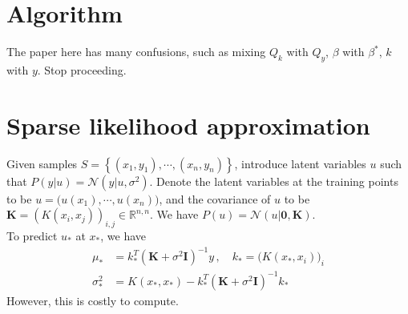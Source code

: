 \documentclass[a4paper,onecolumn]{article}
\begin{document}
\section{Algorithm}
\begin{algorithm}
\end{algorithm}
The paper here has many confusions, such as mixing $Q_k$ with $Q_y$, $\beta$ with $\beta^*$, $k$ with $y$. Stop proceeding.
\newpage
\section{Sparse likelihood approximation}
Given samples $S=\left\{ (x_1, y_1), \cdots, (x_n, y_n) \right\}$, introduce latent variables $u$ such that
$P(y|u) = \mathcal{N}(y|u, \sigma^2)$. Denote the latent variables at the training points to be
$u = \Big(u(x_1), \cdots, u(x_n)\Big)$, and the covariance of $u$ to be $\mathbf{K} = (K(x_i, x_j))_{i,j}\in \mathbb{R}^{n,n}$.
We have $P({u}) = \mathcal{N}({u}|\mathbf{0}, \mathbf{K})$.\\
To predict $u_*$ at $x_*$, we have
\begin{equation*}\begin{split}
    \mu_* &= k_*^T (\mathbf{K}+\sigma^2 \mathbf{I})^{-1} y\, , \quad k_* = \big(K(x_*, x_i)\big)_i\\
    \sigma^2_* &= K(x_*, x_*) - k_*^T (\mathbf{K} + \sigma^2 \mathbf{I})^{-1} k_*
\end{split}\end{equation*}
However, this is costly to compute.\\
\end{document}
